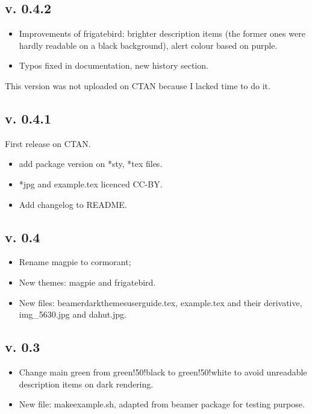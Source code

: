 \documentclass[12pt]{article}
\begin{document}
\subsection*{v. 0.4.2}
\begin{itemize}
   \item Improvements of frigatebird: brighter description items (the former ones were hardly readable on a black background), alert colour based on purple.
   \item Typos fixed in documentation, new history section.
\end{itemize}
This version was not uploaded on CTAN because I lacked time to do it.

\subsection*{v. 0.4.1}
First release on CTAN.
\begin{itemize}
   \item add package version on *sty, *tex files. 
   \item *jpg and example.tex licenced CC-BY. 
   \item Add changelog to README.
\end{itemize}

\subsection*{v. 0.4}

\begin{itemize}
   \item Rename magpie to cormorant; 
   \item New themes: magpie and frigatebird.
   \item New files: \ttfamily{}beamerdarkthemesuserguide.tex\rmfamily{}, \ttfamily{}example.tex\rmfamily{} and their derivative, \ttfamily{}img\_5630.jpg\rmfamily{} and \ttfamily{}dahut.jpg\rmfamily{}.

\end{itemize}

\subsection*{v. 0.3}
\begin{itemize}
   \item Change main green from green!50!black to green!50!white to avoid unreadable description items on dark rendering.
   \item New file: \ttfamily{}makeexample.sh\rmfamily{}, adapted from \ttfamily{}beamer\rmfamily{} package for testing purpose.
\end{itemize}
\end{document}
